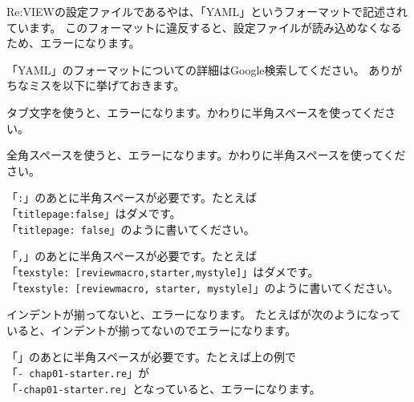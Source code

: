 Re:VIEWの設定ファイルであるやは、「YAML」というフォーマットで記述されています。
このフォーマットに違反すると、設定ファイルが読み込めなくなるため、エラーになります。

「YAML」のフォーマットについての詳細はGoogle検索してください。
ありがちなミスを以下に挙げておきます。

\begin{starteritemize}
\item タブ文字を使うと、エラーになります。かわりに半角スペースを使ってください。
\item 全角スペースを使うと、エラーになります。かわりに半角スペースを使ってください。
\item 「\texttt{:}」のあとに半角スペースが必要です。たとえば\\{}
   「\texttt{titlepage:false}」はダメです。\\{}
   「\texttt{titlepage: false}」のように書いてください。
\item 「\texttt{,}」のあとに半角スペースが必要です。たとえば\\{}
   「\texttt{texstyle: [reviewmacro,starter,mystyle]}」はダメです。\\{}
   「\texttt{texstyle: [reviewmacro, starter, mystyle]}」のように書いてください。
\item インデントが揃ってないと、エラーになります。
   たとえばが次のようになっていると、インデントが揃ってないのでエラーになります。
\end{starteritemize}

\label{}
\begin{starterprogram}\end{starterprogram}

\begin{starteritemize}
\item 「\reviewem{{-}}」のあとに半角スペースが必要です。たとえば上の例で\\{}「\texttt{{-} chap01{-}starter.re}」が\\{}「\texttt{{-}chap01{-}starter.re}」となっていると、エラーになります。
\end{starteritemize}

